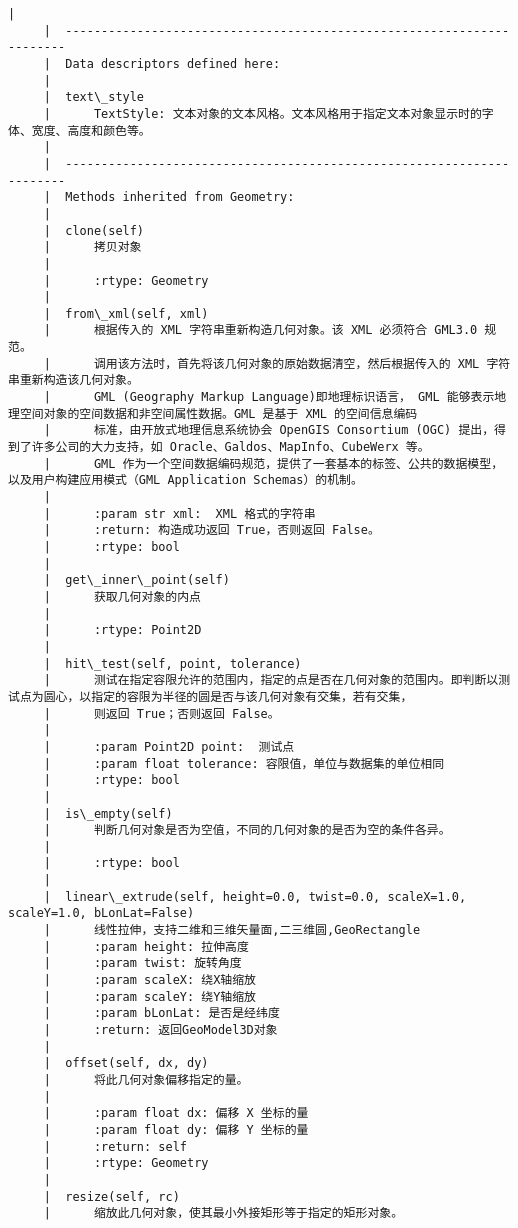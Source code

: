\documentclass[11pt]{article}
\begin{document}
\begin{Verbatim}[commandchars=\\\{\}]
     |  
     |  ----------------------------------------------------------------------
     |  Data descriptors defined here:
     |  
     |  text\_style
     |      TextStyle: 文本对象的文本风格。文本风格用于指定文本对象显示时的字体、宽度、高度和颜色等。
     |  
     |  ----------------------------------------------------------------------
     |  Methods inherited from Geometry:
     |  
     |  clone(self)
     |      拷贝对象
     |      
     |      :rtype: Geometry
     |  
     |  from\_xml(self, xml)
     |      根据传入的 XML 字符串重新构造几何对象。该 XML 必须符合 GML3.0 规范。
     |      调用该方法时，首先将该几何对象的原始数据清空，然后根据传入的 XML 字符串重新构造该几何对象。
     |      GML (Geography Markup Language)即地理标识语言， GML 能够表示地理空间对象的空间数据和非空间属性数据。GML 是基于 XML 的空间信息编码
     |      标准，由开放式地理信息系统协会 OpenGIS Consortium (OGC) 提出，得到了许多公司的大力支持，如 Oracle、Galdos、MapInfo、CubeWerx 等。
     |      GML 作为一个空间数据编码规范，提供了一套基本的标签、公共的数据模型，以及用户构建应用模式（GML Application Schemas）的机制。
     |      
     |      :param str xml:  XML 格式的字符串
     |      :return: 构造成功返回 True，否则返回 False。
     |      :rtype: bool
     |  
     |  get\_inner\_point(self)
     |      获取几何对象的内点
     |      
     |      :rtype: Point2D
     |  
     |  hit\_test(self, point, tolerance)
     |      测试在指定容限允许的范围内，指定的点是否在几何对象的范围内。即判断以测试点为圆心，以指定的容限为半径的圆是否与该几何对象有交集，若有交集，
     |      则返回 True；否则返回 False。
     |      
     |      :param Point2D point:  测试点
     |      :param float tolerance: 容限值，单位与数据集的单位相同
     |      :rtype: bool
     |  
     |  is\_empty(self)
     |      判断几何对象是否为空值，不同的几何对象的是否为空的条件各异。
     |      
     |      :rtype: bool
     |  
     |  linear\_extrude(self, height=0.0, twist=0.0, scaleX=1.0, scaleY=1.0, bLonLat=False)
     |      线性拉伸，支持二维和三维矢量面,二三维圆,GeoRectangle
     |      :param height: 拉伸高度
     |      :param twist: 旋转角度
     |      :param scaleX: 绕X轴缩放
     |      :param scaleY: 绕Y轴缩放
     |      :param bLonLat: 是否是经纬度
     |      :return: 返回GeoModel3D对象
     |  
     |  offset(self, dx, dy)
     |      将此几何对象偏移指定的量。
     |      
     |      :param float dx: 偏移 X 坐标的量
     |      :param float dy: 偏移 Y 坐标的量
     |      :return: self
     |      :rtype: Geometry
     |  
     |  resize(self, rc)
     |      缩放此几何对象，使其最小外接矩形等于指定的矩形对象。

\end{Verbatim}
\end{document}
